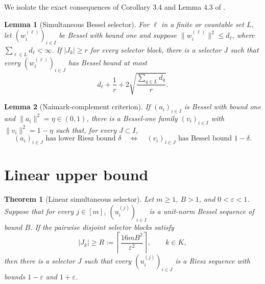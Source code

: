 \documentclass[11pt]{article}
\newtheorem{theorem}{Theorem}
\newtheorem{lemma}{Lemma}
\begin{document}
We isolate the exact consequences of Corollary 3.4 and Lemma 4.3 of
\cite{source}.

\begin{lemma}[Simultaneous Bessel selector]\label{lem:selector}
For \(\ell\) in a finite or countable set \(L\), let
\((w_i^{(\ell)})_{i\in I}\) be Bessel with bound one and suppose
\(\|w_i^{(\ell)}\|^2\le d_\ell\), where \(\sum_{\ell\in L}d_\ell<\infty\).
If \(|J_k|\ge r\) for every selector block, there is a selector \(J\) such
that every \((w_i^{(\ell)})_{i\in J}\) has Bessel bound at most
\[
 d_\ell+\frac1r+2\sqrt{\frac{\sum_{q\in L}d_q}{r}}.
\]
\end{lemma}

\begin{lemma}[Naimark-complement criterion]\label{lem:naimark}
If \((a_i)_{i\in I}\) is Bessel with bound one and
\(\|a_i\|^2=\eta\in(0,1)\), there is a Bessel-one family
\((v_i)_{i\in I}\) with \(\|v_i\|^2=1-\eta\) such that, for every
\(J\subset I\),
\[
 (a_i)_{i\in J}\text{ has lower Riesz bound }\delta
 \quad\Longleftrightarrow\quad
 (v_i)_{i\in J}\text{ has Bessel bound }1-\delta.
\]
\end{lemma}

\section{Linear upper bound}

\begin{theorem}[Linear simultaneous selector]\label{thm:upper}
Let \(m\ge1\), \(B>1\), and \(0<\varepsilon<1\). Suppose that for every
\(j\in[m]\), \((u_i^{(j)})_{i\in I}\) is a unit-norm Bessel sequence of
bound \(B\). If the pairwise disjoint selector blocks satisfy
\[
 |J_k|\ge
 R:=\left\lceil\frac{16mB^2}{\varepsilon^2}\right\rceil,
 \qquad k\in K,
\]
then there is a selector \(J\) such that every
\((u_i^{(j)})_{i\in J}\) is a Riesz sequence with bounds
\(1-\varepsilon\) and \(1+\varepsilon\).
\end{theorem}
\end{document}
